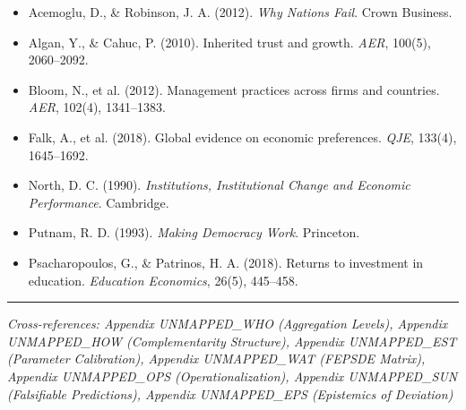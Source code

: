 \begin{itemize}[nosep]
    \item Acemoglu, D., \& Robinson, J. A. (2012). \textit{Why Nations Fail}. Crown Business.
    \item Algan, Y., \& Cahuc, P. (2010). Inherited trust and growth. \textit{AER}, 100(5), 2060--2092.
    \item Bloom, N., et al. (2012). Management practices across firms and countries. \textit{AER}, 102(4), 1341--1383.
    \item Falk, A., et al. (2018). Global evidence on economic preferences. \textit{QJE}, 133(4), 1645--1692.
    \item North, D. C. (1990). \textit{Institutions, Institutional Change and Economic Performance}. Cambridge.
    \item Putnam, R. D. (1993). \textit{Making Democracy Work}. Princeton.
    \item Psacharopoulos, G., \& Patrinos, H. A. (2018). Returns to investment in education. \textit{Education Economics}, 26(5), 445--458.
\end{itemize}

\vspace{1em}
\hrule
\vspace{0.5em}
\noindent\textit{Cross-references: Appendix UNMAPPED_WHO (Aggregation Levels), 
Appendix UNMAPPED_HOW (Complementarity Structure), Appendix UNMAPPED_EST (Parameter Calibration),
Appendix UNMAPPED_WAT (FEPSDE Matrix), Appendix UNMAPPED_OPS (Operationalization), 
Appendix UNMAPPED_SUN (Falsifiable Predictions), Appendix UNMAPPED_EPS (Epistemics of Deviation)}

